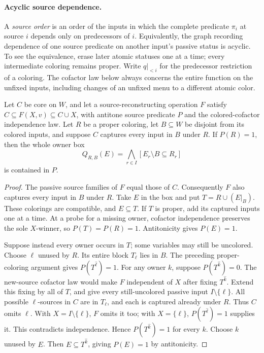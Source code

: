 \paragraph{Acyclic source dependence.}
A \emph{source order} is an order of the inputs in which the complete
predicate $\pi_i$ at source $i$ depends only on predecessors of $i$.
Equivalently, the graph recording dependence of one source predicate on
another input's passive status is acyclic. To see the equivalence, erase
later atomic statuses one at a time; every intermediate coloring remains
proper. Write $q|_{<i}$ for the predecessor restriction of a coloring.
The cofactor law below always concerns the entire function on the unfixed
inputs, including changes of an unfixed menu to a different atomic color.

\begin{lemma}\label{core:lem:captured-rectangle}
Let $C$ be core on $W$, and let a source-reconstructing operation $F$
satisfy $C\subseteq F(X,v)\subseteq C\cup X$, with antitone source
predicate $P$ and the colored-cofactor independence law.
Let $R$ be a proper coloring, let $B\subseteq W$ be disjoint from its
colored inputs, and suppose $C$ captures every input in $B$ under $R$.
If $P(R)=1$, then the whole owner box
\[
 Q_{R,B}(E)=\bigwedge_{r\in I}[E_r\setminus B\subseteq R_r]
\]
is contained in $P$.
\end{lemma}
\begin{proof}
The passive source families of $F$ equal those of $C$. Consequently $F$
also captures every input in $B$ under $R$.
Take $E$ in the box and put $T=R\cup(E|_B)$. These colorings are
compatible, and $E\subseteq T$. If $T$ is proper, add its captured
inputs one at a time. At a probe for a missing owner, cofactor independence
preserves the sole $X$-winner, so $P(T)=P(R)=1$. Antitonicity gives
$P(E)=1$.

Suppose instead every owner occurs in $T$; some variables may still be
uncolored. Choose $\ell$ unused by $R$. Its entire block $T_\ell$
lies in $B$. The preceding proper-coloring argument gives
$P(T^{\widehat\ell})=1$.
For any owner $k$, suppose $P(T^{\widehat k})=0$.
The new-source cofactor law would make $F$ independent of $X$ after
fixing $T^{\widehat k}$. Extend this fixing by all of $T$, and give
every still-uncolored passive input $I\setminus\{\ell\}$.
All possible $\ell$-sources in $C$ are in $T_\ell$, and each is
captured already under $R$. Thus $C$ omits $\ell$.
With $X=I\setminus\{\ell\}$, $F$ omits it too; with $X=\{\ell\}$,
$P(T^{\widehat\ell})=1$ supplies it. This contradicts independence.
Hence $P(T^{\widehat k})=1$ for every $k$.
Choose $k$ unused by $E$. Then $E\subseteq T^{\widehat k}$, giving
$P(E)=1$ by antitonicity.
\end{proof}

